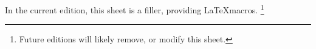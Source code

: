 

In the current edition, this sheet is a filler, providing \LaTeX macros.
  \ifhmode\unskip\fi\footnote{
Future editions will likely remove, or modify this sheet.
  }

\blankpage
